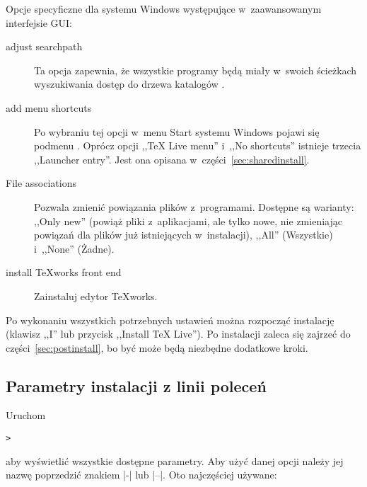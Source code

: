\documentclass{article}
\begin{document}
Opcje specyficzne dla systemu Windows występujące w~zaawansowanym interfejsie GUI{}:
\begin{description}
\item[adjust searchpath] Ta opcja zapewnia, że wszystkie
  programy będą miały w~swoich ścieżkach wyszukiwania dostęp do drzewa
  katalogów \TL.

\item[add menu shortcuts] Po wybraniu tej opcji w~menu Start systemu
  Windows pojawi się podmenu \TL. Oprócz opcji ,,TeX Live menu''
  i~,,No shortcuts'' istnieje trzecia  ,,Launcher entry''.
  Jest ona opisana w~części~\ref{sec:sharedinstall}.

\item[File associations] Pozwala zmienić powiązania plików
  z~programami. Dostępne są warianty: ,,Only new'' (powiąż pliki
  z~aplikacjami, ale tylko nowe, nie zmieniając powiązań dla plików
  już istniejących w~instalacji), ,,All'' (Wszystkie) i~,,None'' (Żadne).

\item[install \TeX{}works front end] Zainstaluj edytor \TeX{}works.
\end{description}

Po wykonaniu wszystkich potrzebnych ustawień można rozpocząć
instalację (klawisz ,,I'' lub przycisk ,,Install TeX Live'').
Po instalacji zaleca się  zajrzeć do części~\ref{sec:postinstall},
bo być może będą niezbędne dodatkowe kroki.



\subsection{Parametry instalacji z linii poleceń}
\label{sec:cmdline}

Uruchom
\begin{alltt}
> 
\end{alltt}
aby wyświetlić wszystkie dostępne parametry. Aby użyć danej opcji należy jej
nazwę poprzedzić znakiem |-| lub |--|.  Oto najczęściej używane:
\end{document}
